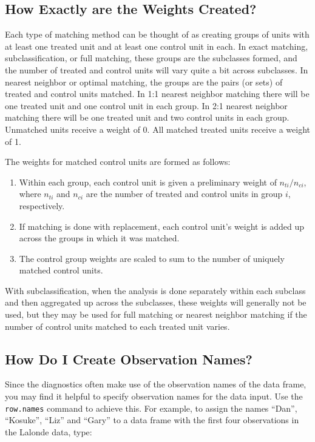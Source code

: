 \documentclass[oneside,letterpaper,12pt]{book}
\begin{document}
\subsection{How Exactly are the Weights Created?}
\label{subsec:weights}

Each type of matching method can be thought of as creating groups of
units with at least one treated unit and at least one control unit in
each.  In exact matching, subclassification, or full matching, these
groups are the subclasses formed, and the number of treated and
control units will vary quite a bit across subclasses.  In nearest
neighbor or optimal matching, the groups are the pairs (or sets) of
treated and control units matched.  In 1:1 nearest neighbor matching
there will be one treated unit and one control unit in each group.  In
2:1 nearest neighbor matching there will be one treated unit and two
control units in each group.  Unmatched units receive a weight of 0.
All matched treated units receive a weight of 1.

The weights for matched control units are formed as follows:
\begin{enumerate}
\item Within each group, each control unit is given a preliminary
  weight of $n_{ti}/n_{ci}$, where $n_{ti}$ and $n_{ci}$ are the
  number of treated and control units in group $i$, respectively.
\item If matching is done with replacement, each control unit's weight
  is added up across the groups in which it was matched.
\item The control group weights are scaled to sum to the number of
  uniquely matched control units.
\end{enumerate}

With subclassification, when the analysis is done separately within
each subclass and then aggregated up across the subclasses, these
weights will generally not be used, but they may be used for full
matching or nearest neighbor matching if the number of control units
matched to each treated unit varies.

\subsection{How Do I Create Observation Names?}
\label{rnames}

Since the diagnostics often make use of the observation names of the
data frame, you may find it helpful to specify observation names for
the data input.  Use the \texttt{row.names} command to achieve this.
For example, to assign the names ``Dan'', ``Kosuke'', ``Liz'' and
``Gary'' to a data frame with the first four observations in the
Lalonde data, type:
\end{document}
